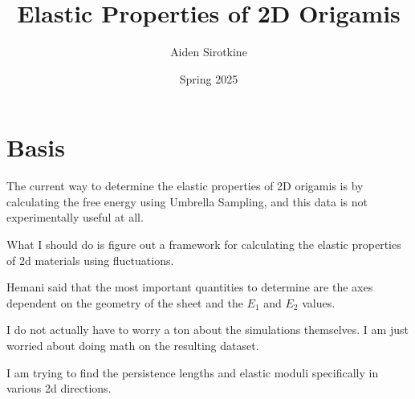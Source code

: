 \documentclass[fleqn]{report}
\date{Spring 2025}
\title{Elastic Properties of 2D Origamis}
\author{Aiden Sirotkine}
\begin{document}
\pagestyle{fancy}
\maketitle
\tableofcontents
\clearpage

\chapter{Basis}
The current way to determine the elastic properties of 2D origamis is by 
calculating the free energy using Umbrella Sampling, and this data is not 
experimentally useful at all.

What I should do is figure out a framework for calculating the elastic properties 
of 2d materials using fluctuations. 

Hemani said that the most important quantities to determine are the 
axes dependent on the geometry of the sheet and the $E_1$ and $E_2$ values.

I do not actually have to worry a ton about the simulations themselves. I 
am just worried about doing math on the resulting dataset. 

I am trying to find the persistence lengths and elastic moduli specifically 
in various 2d directions. 
\end{document}
